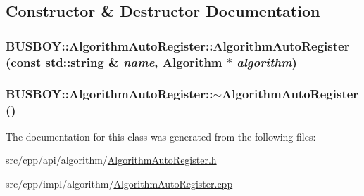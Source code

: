 \subsection{Constructor \& Destructor Documentation}
\hypertarget{classBUSBOY_1_1AlgorithmAutoRegister_a3274914a1f3d25cb96f48d8b790f684e}{
\subsubsection[{AlgorithmAutoRegister}]{\setlength{\rightskip}{0pt plus 5cm}BUSBOY::AlgorithmAutoRegister::AlgorithmAutoRegister (const std::string \& {\em name}, \/  {\bf Algorithm} $\ast$ {\em algorithm})}}
\label{classBUSBOY_1_1AlgorithmAutoRegister_a3274914a1f3d25cb96f48d8b790f684e}
\hypertarget{classBUSBOY_1_1AlgorithmAutoRegister_a5af456a18f948b22c72112b908831537}{
\subsubsection[{$\sim$AlgorithmAutoRegister}]{\setlength{\rightskip}{0pt plus 5cm}BUSBOY::AlgorithmAutoRegister::$\sim$AlgorithmAutoRegister ()}}
\label{classBUSBOY_1_1AlgorithmAutoRegister_a5af456a18f948b22c72112b908831537}


The documentation for this class was generated from the following files:\begin{DoxyCompactItemize}
\item 
src/cpp/api/algorithm/\hyperlink{AlgorithmAutoRegister_8h}{AlgorithmAutoRegister.h}\item 
src/cpp/impl/algorithm/\hyperlink{AlgorithmAutoRegister_8cpp}{AlgorithmAutoRegister.cpp}\end{DoxyCompactItemize}
